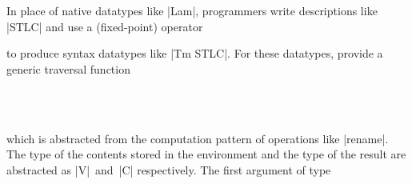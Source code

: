 \documentclass[sigplan,review,fleqn]{acmart}
\renewcommand{\verb}{\collectverb{\color{AgdaFunction}}}
\newcommand{\name}{\collectverb{\it}}
\begin{document}
In place of native datatypes like \verb|Lam|, programmers write descriptions like \verb|STLC| and use a (fixed-point) operator 
\begin{code}
	\>[0]\AgdaSpace{}%
	\AgdaSpace{}%
	\AgdaSymbol{(}\AgdaSpace{}%
	\AgdaSymbol{:}\AgdaSpace{}%
	\AgdaSpace{}%
	\AgdaSymbol{)}\AgdaSpace{}%
	\AgdaSymbol{:}\AgdaSpace{}%
	\AgdaSpace{}%
	\AgdaSpace{}%
	\AgdaSpace{}%
	\AgdaSpace{}%
	\AgdaSpace{}%
	\<%
\end{code}
to produce syntax datatypes like \verb|Tm STLC|.
For these datatypes, \citeauthor{Allais-generic-syntax} provide a generic traversal function
\begin{code}
	\>[0]%
	\>[226I]\AgdaSymbol{:}\AgdaSpace{}%
	\AgdaSpace{}%
	\AgdaSpace{}%
	\AgdaSpace{}%
	\<%
	\\
	\>[.][@{}l@{}]\<[226I]%
	\>[10]\AgdaSpace{}%
	\AgdaSpace{}%
	\AgdaSymbol{\{}\AgdaSymbol{\}}\AgdaSpace{}%
	\AgdaSpace{}%
	\AgdaSpace{}%
	\AgdaSpace{}%
	\AgdaSpace{}%
	\AgdaSpace{}%
	\AgdaSpace{}%
	\AgdaSpace{}%
	\AgdaSymbol{)}\<%
	\\
	\>[10]\AgdaSpace{}%
	\AgdaSpace{}%
	\AgdaSpace{}%
	\AgdaSpace{}%
	\AgdaSpace{}%
	\AgdaSpace{}%
	\AgdaSpace{}%
	\AgdaSpace{}%
	\<%
\end{code}
which is abstracted from the computation pattern of operations like \verb|rename|.
The type of the contents stored in the environment and the type of the result are abstracted as \name|V|~and~\name|C| respectively.
The first argument of type
\end{document}
